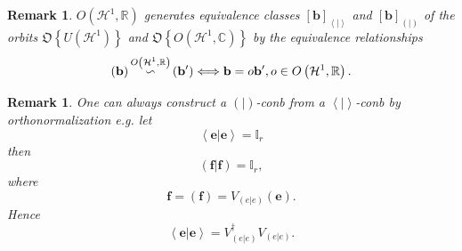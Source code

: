 \documentclass[aps,preprint]{revtex4}%
\newtheorem{remark}[theorem]{Remark}
\begin{document}
\begin{remark}
$O\left(  \mathcal{H}^{1},\mathbb{R}\right)  $ generates equivalence classes
$\left[  \mathbf{b}\right]  _{\left\langle \left.  {}\right\vert \right\rangle
}$ and $\left[  \mathbf{b}\right]  _{\left(  \left.  {}\right\vert \right)  }$
of the orbits $\mathfrak{O}\left\{  U\left(  \mathcal{H}^{1}\right)  \right\}
$ and $\mathfrak{O}\left\{  O\left(  \mathcal{H}^{1},\mathbb{C}\right)
\right\}  $ by the equivalence relationships
\begin{equation}
\left(  \mathbf{b}\right)  \overset{O\left(  \mathcal{H}^{1},\mathbb{R}%
\right)  }{{\Huge \backsim}}\left(  \mathbf{b}^{\prime}\right)
\Longleftrightarrow\mathbf{b}=o\mathbf{b}^{\prime},o\in O\left(
\mathcal{H}^{1},\mathbb{R}\right)  .
\end{equation}

\end{remark}

\begin{remark}
One can always construct a $\left(  \left.  {}\right\vert \right)  $-conb from
a $\left\langle \left.  {}\right\vert \right\rangle $-conb by
orthonormalization e.g. let
\begin{equation}
\left\langle \left.  \mathbf{e}\right\vert \mathbf{e}\right\rangle
=\mathbb{I}_{r}%
\end{equation}
then
\begin{equation}
\left(  \left.  \mathbf{f}\right\vert \mathbf{f}\right)  =\mathbb{I}_{r},
\end{equation}
where
\begin{equation}
\mathbf{f}=\left(  \mathbf{f}\right)  =V_{\left(  \left.  e\right\vert
e\right)  }\left(  \mathbf{e}\right)  .
\end{equation}
Hence
\begin{equation}
\left\langle \left.  \mathbf{e}\right\vert \mathbf{e}\right\rangle =V_{\left(
\left.  e\right\vert e\right)  }^{\dagger}V_{\left(  \left.  e\right\vert
e\right)  }.
\end{equation}

\end{remark}
\end{document}
